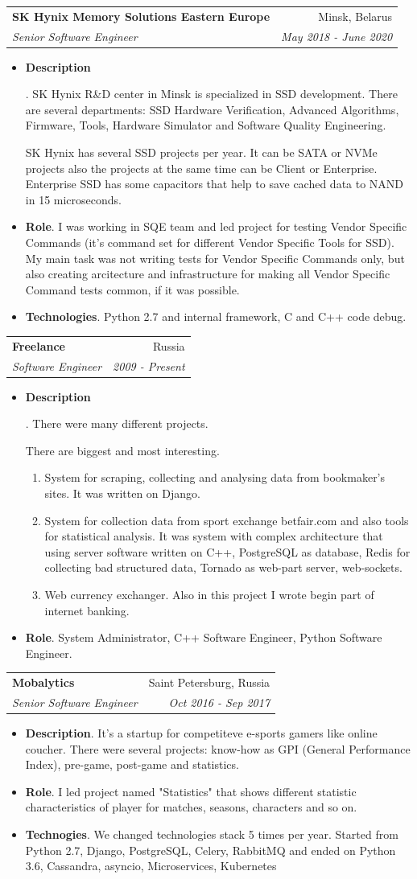 \documentclass[letterpaper,11pt]{article}
\makeatletter
\newcommand{\resumeItem}[2]{
  \item\small{
    \textbf{#1}{. #2 \vspace{-2pt}}
  }
}
\newcommand{\resumeSubheading}[4]{
  \vspace{-1pt}\item
    \begin{tabular*}{0.97\textwidth}{l@{\extracolsep{\fill}}r}
      \textbf{#1} & #2 \\
      \textit{\small#3} & \textit{\small #4} \\
    \end{tabular*}\vspace{-5pt}
}
\newcommand{\resumeItemListStart}{\begin{itemize}}
\newcommand{\resumeItemListEnd}{\end{itemize}\vspace{-5pt}}
\makeatother
\begin{document}
    \resumeSubheading
      {SK Hynix Memory Solutions Eastern Europe}{Minsk, Belarus}
      {Senior Software Engineer}{May 2018 - June 2020}
      \resumeItemListStart
	\resumeItem{Description}
	 {SK Hynix R\&D center in Minsk is specialized in SSD development. There are several departments: SSD Hardware Verification, Advanced Algorithms, Firmware, Tools, Hardware Simulator and Software Quality Engineering.

	SK Hynix has several SSD projects per year. It can be SATA or NVMe projects also the projects at the same time can be Client or Enterprise. Enterprise SSD has some capacitors that help to save cached data to NAND in 15 microseconds.}
	\resumeItem{Role}
	{I was working in SQE team and led project for testing Vendor Specific Commands (it's command set for different Vendor Specific Tools for SSD). My main task was not writing tests for Vendor Specific Commands only, but also creating arcitecture and infrastructure for making all Vendor Specific Command tests common, if it was possible.}
        \resumeItem{Technologies}
          {Python 2.7 and internal framework, C and C++ code debug.}
      \resumeItemListEnd


    \resumeSubheading
      {Freelance}{Russia}
      {Software Engineer}{2009 - Present}
      \resumeItemListStart
        \resumeItem{Description}
          {There were many different projects.

           There are biggest and most interesting.
	   \begin{enumerate}
             \item System for scraping, collecting and analysing data from bookmaker's sites. It was written on Django.
             \item System for collection data from sport exchange betfair.com and also tools for statistical analysis. It was system with complex architecture that using server software written on C++, PostgreSQL as database, Redis for collecting bad structured data, Tornado as web-part server, web-sockets.
             \item Web currency exchanger. Also in this project I wrote begin part of internet banking.
	   \end{enumerate}}
        \resumeItem{Role}
          {System Administrator, C++ Software Engineer, Python Software Engineer.}
      \resumeItemListEnd

    \resumeSubheading
      {Mobalytics}{Saint Petersburg, Russia}
      {Senior Software Engineer}{Oct 2016 - Sep 2017}
      \resumeItemListStart
        \resumeItem{Description}
          {It's a startup for competiteve e-sports gamers like online coucher. There were several projects: know-how as GPI (General Performance Index), pre-game, post-game and statistics.}
	\resumeItem{Role}
	  {I led project named "Statistics" that shows different statistic characteristics of player for matches, seasons, characters and so on.}
        \resumeItem{Technogies}
	  {We changed technologies stack 5 times per year. Started from Python 2.7, Django, PostgreSQL, Celery, RabbitMQ and ended on Python 3.6, Cassandra, asyncio, Microservices, Kubernetes}
      \resumeItemListEnd
\end{document}
